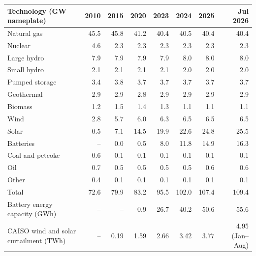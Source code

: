 \begin{tabular}{lrrrrrrr}
\toprule
Technology (GW nameplate) & 2010 & 2015 & 2020 & 2023 & 2024 & 2025 & Jul 2026 \\
\midrule
Natural gas & 45.5 & 45.8 & 41.2 & 40.4 & 40.5 & 40.4 & 40.4 \\
Nuclear & 4.6 & 2.3 & 2.3 & 2.3 & 2.3 & 2.3 & 2.3 \\
Large hydro & 7.9 & 7.9 & 7.9 & 7.9 & 8.0 & 8.0 & 8.0 \\
Small hydro & 2.1 & 2.1 & 2.1 & 2.1 & 2.0 & 2.0 & 2.0 \\
Pumped storage & 3.4 & 3.8 & 3.7 & 3.7 & 3.7 & 3.7 & 3.7 \\
Geothermal & 2.9 & 2.9 & 2.8 & 2.9 & 2.9 & 2.9 & 2.9 \\
Biomass & 1.2 & 1.5 & 1.4 & 1.3 & 1.1 & 1.1 & 1.1 \\
Wind & 2.8 & 5.7 & 6.0 & 6.3 & 6.5 & 6.5 & 6.5 \\
Solar & 0.5 & 7.1 & 14.5 & 19.9 & 22.6 & 24.8 & 25.5 \\
Batteries & -- & 0.0 & 0.5 & 8.0 & 11.8 & 14.9 & 16.3 \\
Coal and petcoke & 0.6 & 0.1 & 0.1 & 0.1 & 0.1 & 0.1 & 0.1 \\
Oil & 0.7 & 0.5 & 0.5 & 0.5 & 0.5 & 0.6 & 0.6 \\
Other & 0.4 & 0.1 & 0.1 & 0.1 & 0.1 & 0.1 & 0.1 \\
\midrule
Total & 72.6 & 79.9 & 83.2 & 95.5 & 102.0 & 107.4 & 109.4 \\
Battery energy capacity (GWh) & -- & -- & 0.9 & 26.7 & 40.2 & 50.6 & 55.6 \\
CAISO wind and solar curtailment (TWh) & -- & 0.19 & 1.59 & 2.66 & 3.42 & 3.77 & 4.95 (Jan--Aug) \\
\bottomrule
\end{tabular}